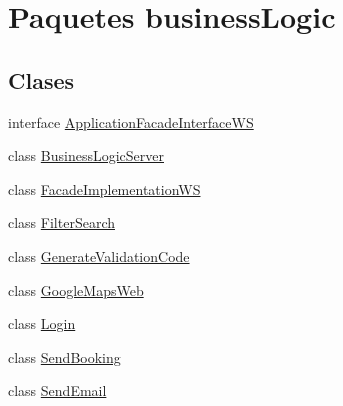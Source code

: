 \hypertarget{namespacebusiness_logic}{}\section{Paquetes business\+Logic}
\label{namespacebusiness_logic}
\subsection*{Clases}
\begin{DoxyCompactItemize}
\item 
interface \mbox{\hyperlink{interfacebusiness_logic_1_1_application_facade_interface_w_s}{Application\+Facade\+Interface\+WS}}
\item 
class \mbox{\hyperlink{classbusiness_logic_1_1_business_logic_server}{Business\+Logic\+Server}}
\item 
class \mbox{\hyperlink{classbusiness_logic_1_1_facade_implementation_w_s}{Facade\+Implementation\+WS}}
\item 
class \mbox{\hyperlink{classbusiness_logic_1_1_filter_search}{Filter\+Search}}
\item 
class \mbox{\hyperlink{classbusiness_logic_1_1_generate_validation_code}{Generate\+Validation\+Code}}
\item 
class \mbox{\hyperlink{classbusiness_logic_1_1_google_maps_web}{Google\+Maps\+Web}}
\item 
class \mbox{\hyperlink{classbusiness_logic_1_1_login}{Login}}
\item 
class \mbox{\hyperlink{classbusiness_logic_1_1_send_booking}{Send\+Booking}}
\item 
class \mbox{\hyperlink{classbusiness_logic_1_1_send_email}{Send\+Email}}
\end{DoxyCompactItemize}
